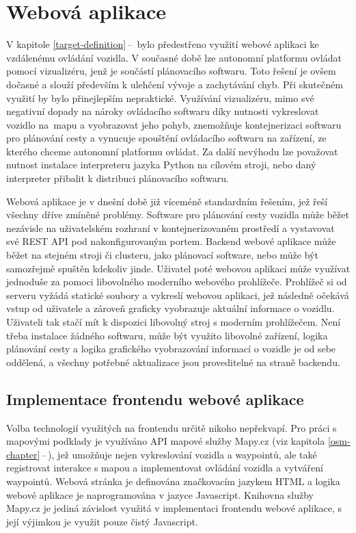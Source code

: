 \documentclass[czech, bachelor]{diploma}
\newcommand{\filipref}[1]{\ref{#1}\,--\,\nameref{#1}}
\begin{document}

\chapter{Webová aplikace} \label{web-app}

V kapitole \filipref{target-definition} bylo předestřeno využití webové aplikaci ke vzdálenému ovládání vozidla. V současné době
lze autonomní platformu ovládat pomocí vizualizéru, jenž je součástí plánovacího softwaru. Toto řešení je ovšem dočasné a slouží
především k ulehčení vývoje a zachytávání chyb. Při skutečném využití by bylo přinejlepším nepraktické. Využívání vizualizéru,
mimo své negativní dopady na nároky ovládacího softwaru díky nutnosti vykreslovat vozidlo na~mapu a vyobrazovat jeho pohyb,
znemožňuje kontejnerizaci softwaru pro plánování cesty a vynucuje spouštění ovládacího softwaru na zařízení, ze kterého chceme
autonomní platformu ovládat. Za další nevýhodu lze považovat nutnost instalace interpreteru jazyka Python na cílovém stroji, nebo
daný interpreter přibalit k distribuci plánovacího softwaru.

Webová aplikace je v dnešní době již víceméně standardním řešením, jež řeší všechny dříve zmíněné problémy. Software pro plánování
cesty vozidla může běžet nezávisle na uživatelském rozhraní v kontejnerizovaném prostředí a vystavovat své REST API
pod nakonfigurovaným portem. Backend webové aplikace může běžet na stejném stroji či clusteru, jako plánovací software, nebo může
být samozřejmě spuštěn kdekoliv jinde. Uživatel poté webovou aplikaci může využívat jednoduše za pomoci libovolného moderního
webového prohlížeče. Prohlížeč si od serveru vyžádá statické soubory a vykreslí webovou aplikaci, jež následně očekává vstup
od uživatele a zároveň graficky vyobrazuje aktuální informace o vozidlu. Uživateli tak stačí mít k dispozici libovolný stroj
s moderním prohlížečem. Není třeba instalace žádného softwaru, může být využito libovolné zařízení, logika plánování cesty
a logika grafického vyobrazování informací o vozidle je od sebe oddělená, a všechny potřebné aktualizace jsou proveditelné
na straně backendu.

\section{Implementace frontendu webové aplikace}

Volba technologií využitých na frontendu určitě nikoho nepřekvapí. Pro práci s mapovými podklady je využíváno API mapové služby
Mapy.cz (viz kapitola \filipref{osm-chapter}), jež umožňuje nejen vykreslování vozidla a waypointů, ale také registrovat interakce
s mapou a implementovat ovládání vozidla a vytváření waypointů. Webová stránka je definována značkovacím jazykem HTML a logika
webové aplikace je naprogramována v jazyce Javascript. Knihovna služby Mapy.cz je jediná závislost využitá v implementaci
frontendu webové aplikace, s její výjimkou je využit pouze čistý Javascript.
\end{document}
